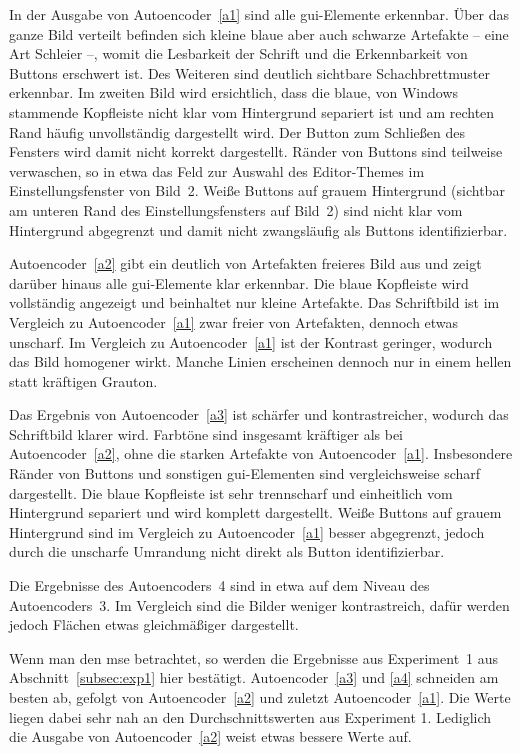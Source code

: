In der Ausgabe von Autoencoder~\ref{a1} sind alle \gls{gui}-Elemente erkennbar. Über das ganze Bild verteilt befinden sich kleine blaue aber auch schwarze Artefakte -- eine Art Schleier --, womit die Lesbarkeit der Schrift und die Erkennbarkeit von Buttons erschwert ist. Des Weiteren sind deutlich sichtbare Schachbrettmuster erkennbar. Im zweiten Bild wird ersichtlich, dass die blaue, von Windows stammende Kopfleiste nicht klar vom Hintergrund separiert ist und am rechten Rand häufig unvollständig dargestellt wird. Der Button zum Schließen des Fensters wird damit nicht korrekt dargestellt. Ränder von Buttons sind teilweise verwaschen, so in etwa das Feld zur Auswahl des Editor-Themes im Einstellungsfenster von Bild~2. Weiße Buttons auf grauem Hintergrund (sichtbar am unteren Rand des Einstellungsfensters auf Bild~2) sind nicht klar vom Hintergrund abgegrenzt und damit nicht zwangsläufig als Buttons identifizierbar.

Autoencoder~\ref{a2} gibt ein deutlich von Artefakten freieres Bild aus und zeigt darüber hinaus alle \gls{gui}-Elemente klar erkennbar. Die blaue Kopfleiste wird vollständig angezeigt und beinhaltet nur kleine Artefakte. Das Schriftbild ist im Vergleich zu Autoencoder~\ref{a1} zwar freier von Artefakten, dennoch etwas unscharf. Im Vergleich zu Autoencoder~\ref{a1} ist der Kontrast geringer, wodurch das Bild homogener wirkt. Manche Linien erscheinen dennoch nur in einem hellen statt kräftigen Grauton.

Das Ergebnis von Autoencoder~\ref{a3} ist schärfer und kontrastreicher, wodurch das Schriftbild klarer wird. Farbtöne sind insgesamt kräftiger als bei Autoencoder~\ref{a2}, ohne die starken Artefakte von Autoencoder~\ref{a1}. Insbesondere Ränder von Buttons und sonstigen \gls{gui}-Elementen sind vergleichsweise scharf dargestellt. Die blaue Kopfleiste ist sehr trennscharf und einheitlich vom Hintergrund separiert und wird komplett dargestellt. Weiße Buttons auf grauem Hintergrund sind im Vergleich zu Autoencoder~\ref{a1} besser abgegrenzt, jedoch durch die unscharfe Umrandung nicht direkt als Button identifizierbar.

Die Ergebnisse des Autoencoders~4 sind in etwa auf dem Niveau des Autoencoders~3. Im Vergleich sind die Bilder weniger kontrastreich, dafür werden jedoch Flächen etwas gleichmäßiger dargestellt.

Wenn man den \gls{mse} betrachtet, so werden die Ergebnisse aus Experiment~1 aus Abschnitt~\ref{subsec:exp1} hier bestätigt. Autoencoder~\ref{a3} und \ref{a4} schneiden am besten ab, gefolgt von Autoencoder~\ref{a2} und zuletzt Autoencoder~\ref{a1}. Die Werte liegen dabei sehr nah an den Durchschnittswerten aus Experiment 1. Lediglich die Ausgabe von Autoencoder~\ref{a2} weist etwas bessere Werte auf.

